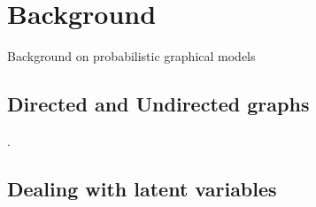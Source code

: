 \chapter{Background}
\label{chapter2}
Background on probabilistic graphical models

\section{Directed and Undirected graphs}.

\section{Dealing with latent variables}



